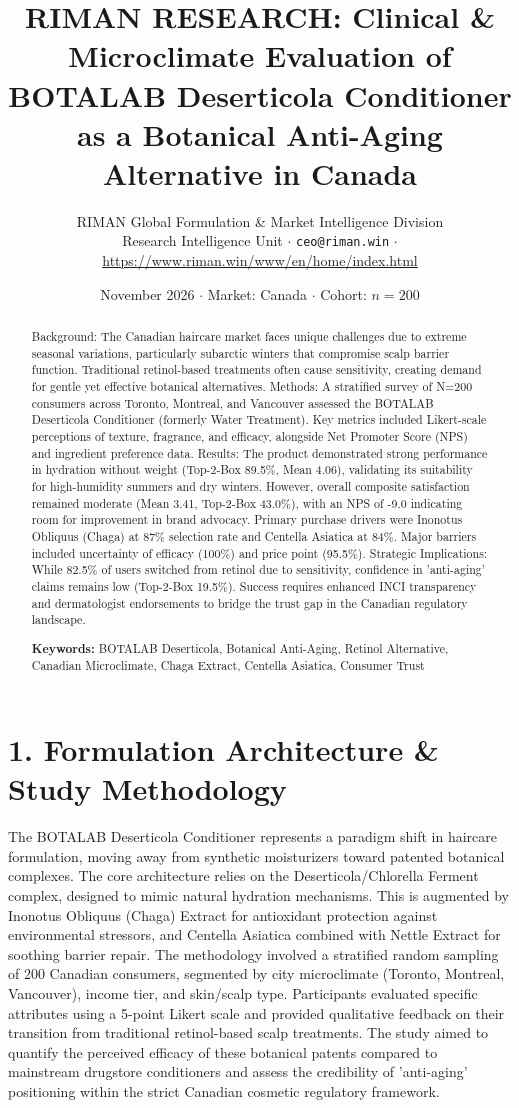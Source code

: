 \documentclass[10pt,twocolumn,a4paper]{article}
\title{\textbf{RIMAN RESEARCH: Clinical \& Microclimate Evaluation of BOTALAB Deserticola Conditioner as a Botanical Anti-Aging Alternative in Canada}}
\author{RIMAN Global Formulation \& Market Intelligence Division\\
\small Research Intelligence Unit $\cdot$ \texttt{ceo@riman.win} $\cdot$ \url{https://www.riman.win/www/en/home/index.html}}
\date{November 2026 \quad $\cdot$ \quad Market: Canada \quad $\cdot$ \quad Cohort: $n = 200$}
\begin{document}
\maketitle

\begin{abstract}
Background: The Canadian haircare market faces unique challenges due to extreme seasonal variations, particularly subarctic winters that compromise scalp barrier function. Traditional retinol-based treatments often cause sensitivity, creating demand for gentle yet effective botanical alternatives. Methods: A stratified survey of N=200 consumers across Toronto, Montreal, and Vancouver assessed the BOTALAB Deserticola Conditioner (formerly Water Treatment). Key metrics included Likert-scale perceptions of texture, fragrance, and efficacy, alongside Net Promoter Score (NPS) and ingredient preference data. Results: The product demonstrated strong performance in hydration without weight (Top-2-Box 89.5\%, Mean 4.06), validating its suitability for high-humidity summers and dry winters. However, overall composite satisfaction remained moderate (Mean 3.41, Top-2-Box 43.0\%), with an NPS of -9.0 indicating room for improvement in brand advocacy. Primary purchase drivers were Inonotus Obliquus (Chaga) at 87\% selection rate and Centella Asiatica at 84\%. Major barriers included uncertainty of efficacy (100\%) and price point (95.5\%). Strategic Implications: While 82.5\% of users switched from retinol due to sensitivity, confidence in 'anti-aging' claims remains low (Top-2-Box 19.5\%). Success requires enhanced INCI transparency and dermatologist endorsements to bridge the trust gap in the Canadian regulatory landscape.

\vspace{0.4em}
\noindent\textbf{Keywords:} BOTALAB Deserticola, Botanical Anti-Aging, Retinol Alternative, Canadian Microclimate, Chaga Extract, Centella Asiatica, Consumer Trust
\end{abstract}

\section{1. Formulation Architecture \& Study Methodology}
The BOTALAB Deserticola Conditioner represents a paradigm shift in haircare formulation, moving away from synthetic moisturizers toward patented botanical complexes. The core architecture relies on the Deserticola/Chlorella Ferment complex, designed to mimic natural hydration mechanisms. This is augmented by Inonotus Obliquus (Chaga) Extract for antioxidant protection against environmental stressors, and Centella Asiatica combined with Nettle Extract for soothing barrier repair. The methodology involved a stratified random sampling of 200 Canadian consumers, segmented by city microclimate (Toronto, Montreal, Vancouver), income tier, and skin/scalp type. Participants evaluated specific attributes using a 5-point Likert scale and provided qualitative feedback on their transition from traditional retinol-based scalp treatments. The study aimed to quantify the perceived efficacy of these botanical patents compared to mainstream drugstore conditioners and assess the credibility of 'anti-aging' positioning within the strict Canadian cosmetic regulatory framework.
\end{document}
